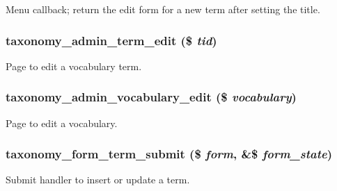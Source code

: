 Menu callback; return the edit form for a new term after setting the title. \hypertarget{taxonomy_8admin_8inc_120bfb94c940af0d98d447e47aec0c0b}{
\subsubsection[{taxonomy\_\-admin\_\-term\_\-edit}]{\setlength{\rightskip}{0pt plus 5cm}taxonomy\_\-admin\_\-term\_\-edit (\$ {\em tid})}}
\label{taxonomy_8admin_8inc_120bfb94c940af0d98d447e47aec0c0b}


Page to edit a vocabulary term. \hypertarget{taxonomy_8admin_8inc_0aad51b0e07b0eed3689a78edc2b17cb}{
\subsubsection[{taxonomy\_\-admin\_\-vocabulary\_\-edit}]{\setlength{\rightskip}{0pt plus 5cm}taxonomy\_\-admin\_\-vocabulary\_\-edit (\$ {\em vocabulary})}}
\label{taxonomy_8admin_8inc_0aad51b0e07b0eed3689a78edc2b17cb}


Page to edit a vocabulary. \hypertarget{taxonomy_8admin_8inc_47414380bfb0caa70eb3d35a7e153ac0}{
\subsubsection[{taxonomy\_\-form\_\-term\_\-submit}]{\setlength{\rightskip}{0pt plus 5cm}taxonomy\_\-form\_\-term\_\-submit (\$ {\em form}, \/  \&\$ {\em form\_\-state})}}
\label{taxonomy_8admin_8inc_47414380bfb0caa70eb3d35a7e153ac0}


Submit handler to insert or update a term.

